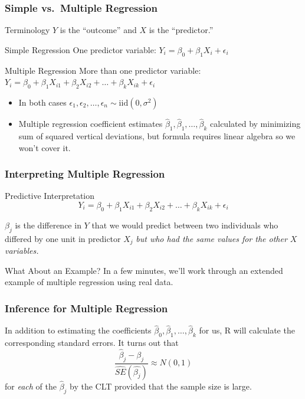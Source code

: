 \documentclass[handout]{beamer}
\begin{document}
\begin{frame}
\frametitle{Simple vs.\ Multiple Regression}
\begin{block}{Terminology}
$Y$ is the ``outcome'' and $X$ is the ``predictor.''
\end{block}

\begin{block}{Simple Regression}
One predictor variable: $Y_i = \beta_0 + \beta_1 X_i + \epsilon_i$
\end{block}
\begin{block}{Multiple Regression}
More than one predictor variable: $Y_i = \beta_0 + \beta_1 X_{i1} + \beta_2 X_{i2} +  \hdots + \beta_k X_{ik} + \epsilon_i$
\end{block}


\begin{itemize}
	\item In both cases $\epsilon_1, \epsilon_2, \hdots, \epsilon_n \sim \mbox{iid} (0,\sigma^2)$
	\item Multiple regression coefficient estimates $\widehat{\beta}_1, \widehat{\beta}_1, \hdots, \widehat{\beta}_k$ calculated by minimizing  sum of squared vertical deviations, but formula requires linear algebra so we won't cover it.
\end{itemize}
\end{frame}


\begin{frame}
\frametitle{Interpreting Multiple Regression}

\begin{block}{Predictive Interpretation}
$$Y_i = \beta_0 + \beta_1 X_{i1} + \beta_2 X_{i2} +  \hdots + \beta_k X_{ik} + \epsilon_i$$

$\beta_j$ is the difference in $Y$ that we would predict between two individuals who differed by one unit in predictor $X_j$ \emph{\alert{but who had the same values for the other $X$ variables.}} 

\end{block}

\begin{block}{What About an Example?}
	In a few minutes, we'll work through an extended example of multiple regression using real data.
\end{block}
\end{frame}

\begin{frame}
\frametitle{Inference for Multiple Regression}

In addition to estimating the coefficients $\widehat{\beta}_0, \widehat{\beta}_1, \hdots, \widehat{\beta}_k$ for us, R will calculate the corresponding standard errors. It turns out that
	$$\frac{\widehat{\beta}_j - \beta_j}{\widehat{SE}(\widehat{\beta_j})} \approx N(0,1)$$
for \emph{each} of the $\widehat{\beta}_j$ by the CLT provided that the sample size is large.

\end{frame}
\end{document}
